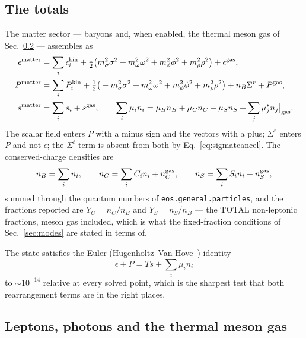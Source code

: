 \documentclass[aps,prc,onecolumn,superscriptaddress,nofootinbib,10pt]{revtex4-2}
\newcommand{\nB}{n_B}
\newcommand{\nC}{n_C}
\newcommand{\nS}{n_S}
\newcommand{\muB}{\mu_B}
\newcommand{\muC}{\mu_C}
\newcommand{\muS}{\mu_S}
\newcommand{\Sigmar}{\Sigma^{r}}
\newcommand{\Sigmat}{\Sigma^{t}}
\begin{document}
\subsection{The totals}

The matter sector --- baryons and, when enabled, the thermal meson gas of
Sec.~\ref{sec:extras} --- assembles as
\begin{align}
  \epsilon^{\rm matter} &= \sum_i \epsilon^{\rm kin}_i
     + \tfrac{1}{2}\big(m_\sigma^2\sigma^2 + m_\omega^2\omega^2
       + m_\phi^2\phi^2 + m_\rho^2\rho^2\big) + \epsilon^{\rm gas} ,
  \label{eq:epstot} \\
  P^{\rm matter} &= \sum_i P^{\rm kin}_i
     + \tfrac{1}{2}\big(-m_\sigma^2\sigma^2 + m_\omega^2\omega^2
       + m_\phi^2\phi^2 + m_\rho^2\rho^2\big)
     + \nB \Sigmar + P^{\rm gas} ,
  \label{eq:Ptot} \\
  s^{\rm matter} &= \sum_i s_i + s^{\rm gas} ,
  \qquad
  \sum_i \mu_i n_i = \muB \nB + \muC \nC + \muS \nS
                     + \sum_j \mu^*_j n_j\big|_{\rm gas} .
  \label{eq:stot}
\end{align}
The scalar field enters $P$ with a minus sign and the vectors with a plus;
$\Sigmar$ enters $P$ and not $\epsilon$; the $\Sigmat$ term is absent from both
by Eq.~\eqref{eq:sigmatcancel}. The conserved-charge densities are
\begin{equation}
  \nB = \sum_i n_i , \qquad
  \nC = \sum_i C_i n_i + n_C^{\rm gas} , \qquad
  \nS = \sum_i S_i n_i + n_S^{\rm gas} ,
\end{equation}
summed through the quantum numbers of \texttt{eos.general.particles}, and the
fractions reported are $Y_C = \nC/\nB$ and $Y_S = \nS/\nB$ --- the TOTAL
non-leptonic fractions, meson gas included, which is what the fixed-fraction
conditions of Sec.~\ref{sec:modes} are stated in terms of.

The state satisfies the Euler (Hugenholtz--Van Hove~\cite{HugenholtzVanHove1958})
identity
\begin{equation}
  \epsilon + P = T s + \sum_i \mu_i n_i
  \label{eq:euler}
\end{equation}
to $\sim 10^{-14}$ relative at every solved point, which is the sharpest test
that both rearrangement terms are in the right places.

\subsection{Leptons, photons and the thermal meson gas}
\label{sec:extras}
\end{document}
